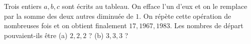 Trois entiers $a, b, c$ sont écrits au tableau. On efface l'un d'eux et on le remplace par la somme des deux autres diminuée de $1$. On répète cette opération de nombreuses fois et on obtient finalement $17, 1967, 1983$. Les nombres de départ pouvaient-ils être (a) $2, 2, 2$ ? (b) $3, 3, 3$ ?
